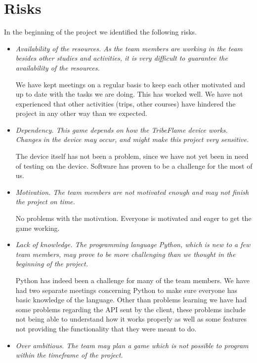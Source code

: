 \documentclass[12pt,a4paper]{article}
\begin{document}
\section{Risks}

In the beginning of the project we identified the following risks.

\begin{itemize}
\item \textit{Availability of the resources. As the team members are working in the team besides other studies and activities, it is very difficult to guarantee the availability of the resources.}

We have kept meetings on a regular basis to keep each other motivated and up to date with the tasks we are doing. This has worked well. We have not experienced that other activities (trips, other courses) have hindered the project in any other way than we expected.
\item \textit{Dependency. This game depends on how the TribeFlame device works. Changes in the device may occur, and might make this project very sensitive.}

The device itself has not been a problem, since we have not yet been in need of testing on the device. Software has proven to be a challenge for the most of us.

\item \textit{Motivation. The team members are not motivated enough and may not finish the project on time.}

No problems with the motivation. Everyone is motivated and eager to get the game working.

\item \textit{Lack of knowledge. The programming language Python, which is new to a few team members, may prove to be more challenging than we thought in the beginning of the project.}

Python has indeed been a challenge for many of the team members. We have had two separate meetings concerning Python to make sure everyone has basic knowledge of the language. Other than problems learning we have had some problems regarding the API sent by the client, these problems include not being able to understand how it works properly as well as some features not providing the functionality that they were meant to do.

\item \textit{Over ambitious. The team may plan a game which is not possible to program within the timeframe of the project.}


\end{itemize}
\end{document}
